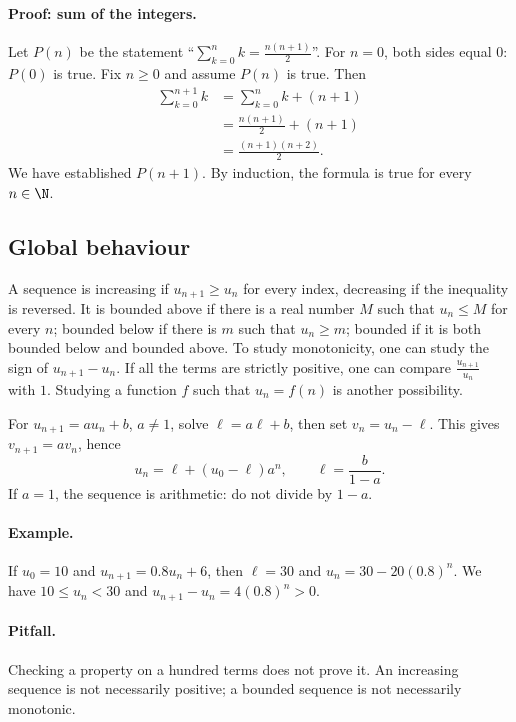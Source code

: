 \paragraph{Proof: sum of the integers.} Let $P(n)$ be the statement ``$\sum_{k=0}^n k=\frac{n(n+1)}{2}$''.
For $n=0$, both sides equal $0$: $P(0)$ is true.
Fix $n\ge0$ and assume $P(n)$ is true. Then
\[\begin{aligned}\sum_{k=0}^{n+1}k&=\sum_{k=0}^nk+(n+1)\\&=\frac{n(n+1)}2+(n+1)\\&=\frac{(n+1)(n+2)}2.\end{aligned}\]
We have established $P(n+1)$. By induction, the formula is true for every $n\in\N$.
\subsection{Global behaviour}
A sequence is increasing if $u_{n+1}\ge u_n$ for every index, decreasing if the inequality is reversed. It is bounded above if there is a real number $M$ such that $u_n\le M$ for every $n$; bounded below if there is $m$ such that $u_n\ge m$; bounded if it is both bounded below and bounded above.
To study monotonicity, one can study the sign of $u_{n+1}-u_n$. If all the terms are strictly positive, one can compare $\frac{u_{n+1}}{u_n}$ with $1$. Studying a function $f$ such that $u_n=f(n)$ is another possibility.
\begin{method}
For $u_{n+1}=au_n+b$, $a\ne1$, solve $\ell=a\ell+b$, then set $v_n=u_n-\ell$. This gives $v_{n+1}=av_n$, hence
\[u_n=\ell+(u_0-\ell)a^n,\qquad\ell=\frac{b}{1-a}.\]
If $a=1$, the sequence is arithmetic: do not divide by $1-a$.
\end{method}
\paragraph{Example.} If $u_0=10$ and $u_{n+1}=0.8u_n+6$, then $\ell=30$ and $u_n=30-20(0.8)^n$. We have $10\le u_n<30$ and $u_{n+1}-u_n=4(0.8)^n>0$.
\paragraph{Pitfall.} Checking a property on a hundred terms does not prove it. An increasing sequence is not necessarily positive; a bounded sequence is not necessarily monotonic.


